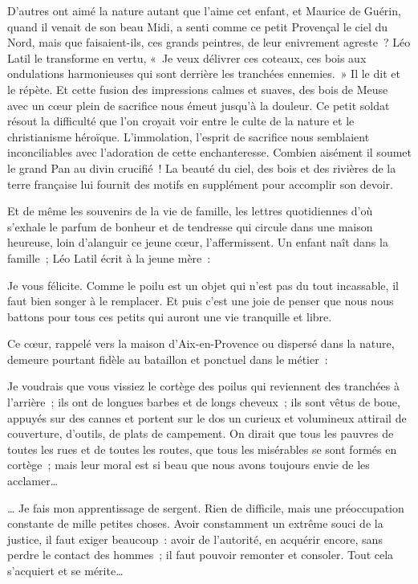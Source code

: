 \documentclass[french,twoside]{book} %
\newenvironment{quoteblock}%
  {\begin{quoting}}
  {\end{quoting}}
\newenvironment{quotebar}{%
    \def\FrameCommand{{\color{rubric!10!}\vrule width 0.5em} \hspace{0.9em}}%
    \def\OuterFrameSep{\itemsep} %
    \MakeFramed {\advance\hsize-\width \FrameRestore}
  }%
  {%
    \endMakeFramed
  }
\renewenvironment{quoteblock}%
  {%
    \savenotes
    \setstretch{0.9}
    \normalfont
    \begin{quotebar}
  }
  {%
    \end{quotebar}
    \spewnotes
  }
\begin{document}
\noindent D’autres ont aimé la nature autant que l’aime cet enfant, et Maurice de Guérin, quand il venait de son beau Midi, a senti comme ce petit Provençal le ciel du Nord, mais que faisaient-ils, ces grands peintres, de leur enivrement agreste ? Léo Latil le transforme en vertu, « Je veux délivrer ces coteaux, ces bois aux ondulations harmonieuses qui sont derrière les tranchées ennemies. » Il le dit et le répète. Et cette fusion des impressions calmes et suaves, des bois de Meuse avec un cœur plein de sacrifice nous émeut jusqu’à la douleur. Ce petit soldat résout la difficulté que l’on croyait voir entre le culte de la nature et le christianisme héroïque. L’immolation, l’esprit de sacrifice nous semblaient inconciliables avec l’adoration de cette enchanteresse. Combien aisément il soumet le grand Pan au divin crucifié ! La beauté du ciel, des bois et des rivières de la terre française lui fournit des motifs en supplément pour accomplir son devoir.‌\par
Et de même les souvenirs de la vie de famille, les lettres quotidiennes d’où s’exhale le parfum de bonheur et de tendresse qui circule dans une maison heureuse, loin d’alanguir ce jeune cœur, l’affermissent. Un enfant naît dans la famille ; Léo Latil écrit à la jeune mère :‌\par

\begin{quoteblock}
 \noindent Je vous félicite. Comme le poilu est un objet qui n’est pas du tout incassable, il faut bien songer à le remplacer. Et puis c’est une joie de penser que nous nous battons pour tous ces petits qui auront une vie tranquille et libre.‌
 \end{quoteblock}

\noindent Ce cœur, rappelé vers la maison d’Aix-en-Provence ou dispersé dans la nature, demeure pourtant fidèle au bataillon et ponctuel dans le métier :‌\par

\begin{quoteblock}
 \noindent Je voudrais que vous vissiez le cortège des poilus qui reviennent des tranchées à l’arrière ; ils ont de longues barbes et de longs cheveux ; ils sont vêtus de boue, appuyés sur des cannes et portent sur le dos un curieux et volumineux attirail de couverture, d’outils, de plats de campement. On dirait que tous les pauvres de toutes les rues et de toutes les routes, que tous les misérables se sont formés en cortège ; mais leur moral est si beau que nous avons toujours envie de les acclamer…‌\par
 … Je fais mon apprentissage de sergent. Rien de difficile, mais une préoccupation constante de mille petites choses. Avoir constamment un extrême souci de la justice, il faut exiger beaucoup : avoir de l’autorité, en acquérir encore, sans perdre le contact des hommes ; il faut pouvoir remonter et consoler. Tout cela s’acquiert et se mérite…‌
 \end{quoteblock}
\end{document}
